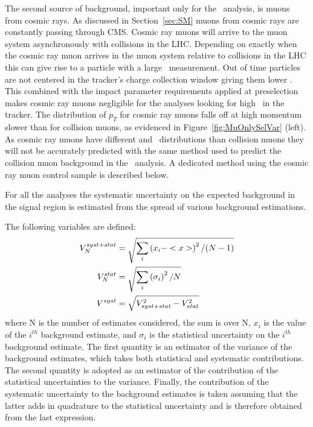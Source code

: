 The second source of background, important only for the \muononly\  analysis,
is muons from cosmic rays. 
As discussed in Section~\ref{sec:SM} muons from cosmic rays
are constantly passing through CMS. Cosmic ray muons will arrive to the muon system asynchronously with collisions in the LHC. Depending on exactly
when the cosmic ray muon arrives in the muon system relative to collisions in the LHC this can give rise to a particle with a large \invbeta\ measurement.
Out of time particles are not centered in the tracker's charge collection window giving them lower \dedx. This combined
with the impact parameter requirements applied at preselection makes cosmic ray muons negligible for the analyses looking for high \dedx\ in the tracker.
The distribution of $p_T$ for cosmic ray muons falls off at high momentum slower than for collision muons, as evidenced in Figure~\ref{fig:MuOnlySelVar} (left).
As cosmic ray muons have different \invbeta and \pt\ distributions than collision muons they will not be accurately predicted with the same method used to predict
the collision muon background in the \muononly\ analysis. A dedicated method using the cosmic ray muon control sample is described below.

For all the analyses the systematic uncertainty on the expected background in the signal
region is estimated from the spread of various background estimations.

The following variables are defined:
\begin{equation}
\centering
\begin{split}
V^{syst+stat}_{N} &= \sqrt{\sum_i \left( x_i - <x> \right) ^2/(N-1)} \\
V^{stat}_{N} &= \sqrt{\sum_i \left( \sigma _i \right) ^2/N} \\
V^{syst} &= \sqrt{V_{syst+stat}^2-V_{stat}^2} \\
\end{split}
\label{eq:variance}
\end{equation}
where N is the number of estimates considered,
the sum is over N, $x_i$ is the value of the $i^{th}$ background estimate,
and $\sigma_i$ is the statistical uncertainty on
the $i^{th}$ background estimate. The first quantity is an estimator of the
variance of the background estimates, which takes both statistical
and systematic contributions. The second quantity is adopted as an
estimator of the contribution of the statistical uncertainties
to the variance. Finally, the contribution of the
systematic uncertainty to the background estimates is taken assuming
that the latter adds in quadrature to the statistical uncertainty and
is therefore obtained from the last expression.

